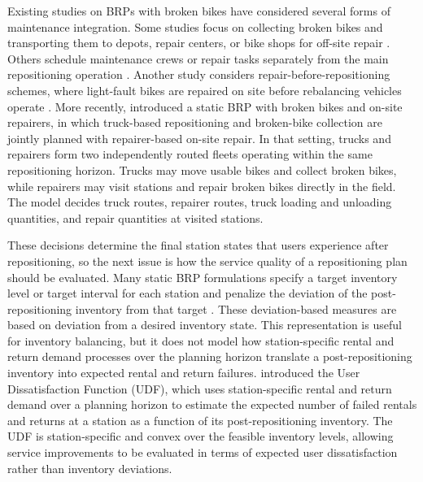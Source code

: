 Existing studies on BRPs with broken bikes have considered several forms of
maintenance integration. Some studies focus on collecting broken bikes and
transporting them to depots, repair centers, or bike shops for off-site repair
\citep{wangStaticGreenRepositioning2018,wangEnhancedArtificialBee2021}.
Others schedule maintenance crews or repair tasks separately from the main
repositioning operation \citep{luTaskAssignmentPredictive2022}. Another study
considers repair-before-repositioning schemes, where light-fault bikes are
repaired on site before rebalancing vehicles operate
\citep{zhangBikeRebalancingMaintenance2022}. More recently,
\citet{huRepositioningBikeSharing2025} introduced a static BRP with broken
bikes and on-site repairers, in which truck-based repositioning and
broken-bike collection are jointly planned with repairer-based on-site repair.
In that setting, trucks and repairers form two independently routed fleets
operating within the same repositioning horizon. Trucks may move usable bikes
and collect broken bikes, while repairers may visit stations and repair broken
bikes directly in the field. The model decides truck routes, repairer routes,
truck loading and unloading quantities, and repair quantities at visited
stations.

These decisions determine the final station states that users experience after
repositioning, so the next issue is how the service quality of a repositioning
plan should be evaluated. Many static BRP formulations specify a target
inventory level or target interval for each station and penalize the deviation
of the post-repositioning inventory from that target
\citep{benchimolBalancingStationsSelf2011,schuijbroekInventoryRebalancingVehicle2017}.
These deviation-based measures are based on deviation from a desired inventory
state. This representation is useful for inventory balancing, but it does not
model how station-specific rental and return demand processes over the
planning horizon translate a post-repositioning inventory into expected rental
and return failures.
\citet{ravivOptimalInventoryManagement2013} introduced the User Dissatisfaction
Function (UDF), which uses station-specific rental and return demand over a
planning horizon to estimate the expected number of failed rentals and returns
at a station as a function of its post-repositioning inventory. The UDF is
station-specific and convex over the feasible inventory levels, allowing
service improvements to be evaluated in terms of expected user dissatisfaction
rather than inventory deviations.

